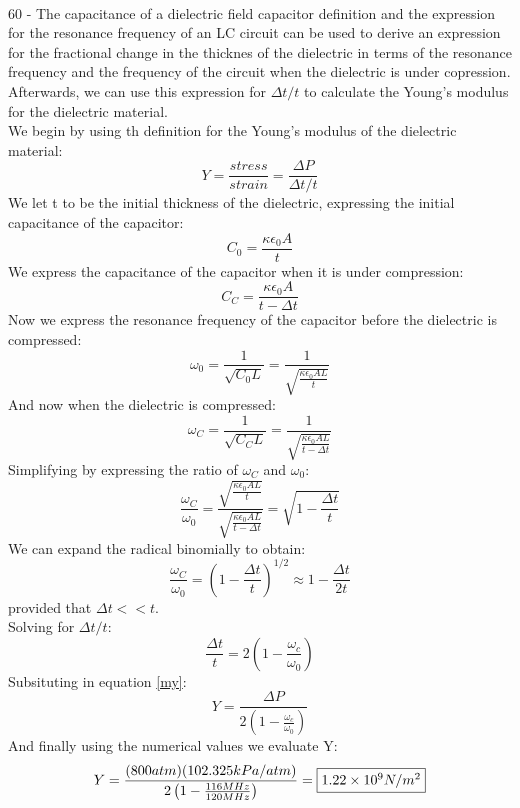 \documentclass{report}
\begin{document}
\paragraph{}
60 - The capacitance of a dielectric field capacitor definition and the expression for the resonance frequency of an LC circuit can be used to derive an expression for the fractional change in the thicknes of the dielectric in terms of the resonance frequency and the frequency of the circuit when the dielectric is under copression. Afterwards, we can use this expression for $\Delta t / t$ to calculate the Young's modulus for the dielectric material.\\
We begin by using th definition for the Young's modulus of the dielectric material:
\begin{equation}\label{my}
  Y = \frac{stress}{strain} = \frac{\Delta P}{\Delta t / t}
\end{equation}
We let t to be the initial thickness of the dielectric, expressing the initial capacitance of the capacitor:
$$C_0 = \frac{\kappa \epsilon_0 A}{t}$$
We express the capacitance of the capacitor when it is under compression:
$$C_C = \frac{\kappa \epsilon_0 A}{t - \Delta t}$$
Now we express the resonance frequency of the capacitor before the dielectric is compressed:
$$\omega_0 = \frac{1}{\sqrt{C_0L}} = \frac{1}{\sqrt{\frac{\kappa \epsilon_0 AL}{t}}}$$
And now when the dielectric is compressed:
$$\omega_C = \frac{1}{\sqrt{C_CL}} = \frac{1}{\sqrt{\frac{\kappa \epsilon_0 AL}{t - \Delta t}}}$$
Simplifying by expressing the ratio of $\omega_C$ and $\omega_0$:
$$\frac{\omega_C}{\omega_0} = \frac{\sqrt{\frac{\kappa \epsilon_0 AL}{t}}}{\sqrt{\frac{\kappa \epsilon_0 AL}{t - \Delta t}}} = \sqrt{1 - \frac{\Delta t}{t}}$$
We can expand the radical binomially to obtain:
$$\frac{\omega_C}{\omega_0} = \left( 1 - \frac{\Delta t}{t} \right)^{1/2} \approx 1 - \frac{\Delta t}{2t}$$
provided that $\Delta t << t$.\\
Solving for $\Delta t / t$:
$$\frac{\Delta t}{t} = 2 \left( 1 - \frac{\omega_c}{\omega_0} \right)$$
Subsituting in equation \ref{my}:
$$Y = \frac{\Delta P}{2 \left( 1 - \frac{\omega_c}{\omega_0} \right)}$$
And finally using the numerical values we evaluate Y:
$$Y = \frac{(800atm)(102.325kPa/atm)}{2 \left( 1 - \frac{116MHz}{120MHz} \right)} = \fbox{$1.22 \times 10^9 N / m^2$}$$
\end{document}
